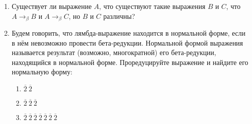 \begin{enumerate}
    \item Существует ли выражение $A$, что существуют такие выражения $B$ и $C$, что
          $A \rightarrow_\beta B$ и $A \rightarrow_\beta C$, но $B$ и $C$ различны?

          \begin{solution}

          \end{solution}

    \item Будем говорить, что лямбда-выражение находится в нормальной форме, если в нём невозможно
          провести бета-редукции. Нормальной формой выражения называется результат (возможно, многократной)
          его бета-редукции, находящийся в нормальной форме.
          Проредуцируйте выражение и найдите его нормальную форму:
          \begin{enumerate}
              \item $\overline{2}\ \overline{2}$
              \item $\overline{2}\ \overline{2}\ \overline{2}$
              \item $\overline{2}\ \overline{2}\ \overline{2}\ \overline{2}\ \overline{2}\ \overline{2}\ \overline{2}$
          \end{enumerate}


\end{enumerate}

